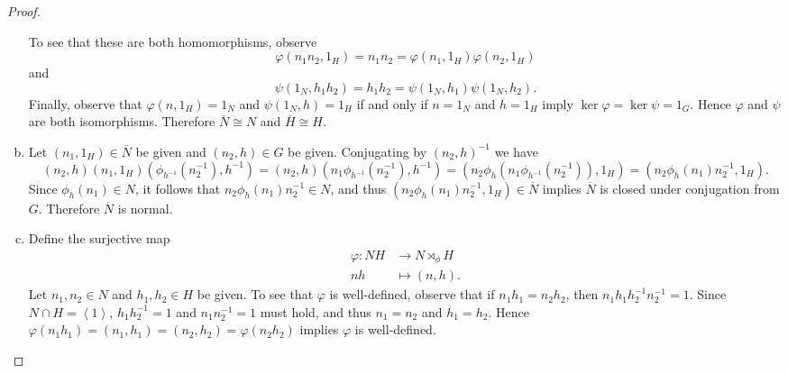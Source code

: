 \documentclass[10pt]{amsart}
\begin{document}
\begin{thm}
\begin{proof}
\begin{enumerate}[(a)]
      To see that these are both homomorphisms, observe
      $$\varphi(n_1n_2, 1_H) = n_1n_2 = \varphi(n_1, 1_H)\varphi(n_2, 1_H)$$
      and
      $$\psi(1_N, h_1h_2) = h_1h_2 = \psi(1_N, h_1)\psi(1_N, h_2).$$
      Finally, observe that $\varphi(n,1_H) = 1_N$ and $\psi(1_N, h) = 1_H$ if and only if $n = 1_N$ and $h = 1_H$ imply $\ker\varphi = \ker\psi = 1_G$.
      Hence $\varphi$ and $\psi$ are both isomorphisms.
      Therefore $\overline{N} \cong N$ and $\overline{H} \cong H$.
    \item
      Let $(n_1, 1_H) \in \overline{N}$ be given and $(n_2, h) \in G$ be given.
      Conjugating by $(n_2, h)^{-1}$ we have
      $$(n_2, h)(n_1, 1_H)(\phi_{h^{-1}}(n_2^{-1}), h^{-1}) = (n_2, h)(n_1\phi_{h^{-1}}(n_2^{-1}), h^{-1}) = (n_2\phi_h(n_1\phi_{h^{-1}}(n_2^{-1})), 1_H) = (n_2\phi_h(n_1)n_2^{-1}, 1_H).$$
      Since $\phi_h(n_1) \in N$, it follows that $n_2\phi_h(n_1)n_2^{-1} \in N$, and thus $(n_2\phi_h(n_1)n_2^{-1}, 1_H) \in \overline{N}$ implies $\overline{N}$ is closed under conjugation from $G$.
      Therefore $\overline{N}$ is normal.
      
    \item
		Define the surjective map
		\begin{align*}
			\varphi \colon NH &\rightarrow N \rtimes_\phi H\\
			nh & \mapsto (n, h).
		\end{align*}
		Let $n_1, n_2 \in N$ and $h_1, h_2 \in H$ be given.
		To see that $\varphi$ is well-defined, observe that if $n_1h_1 = n_2h_2$, then $n_1h_1h_2^{-1}n_2^{-1} = 1$.
		Since $N \cap H = \left< 1 \right>$, $h_1h_2^{-1} = 1$ and $n_1n_2^{-1} = 1$ must hold, and thus $n_1 = n_2$ and $h_1 = h_2$.
		Hence $\varphi(n_1h_1) = (n_1,h_1) = (n_2, h_2) = \varphi(n_2h_2)$ implies $\varphi$ is well-defined.
		

\end{enumerate}
\end{proof}
\end{thm}
\end{document}
